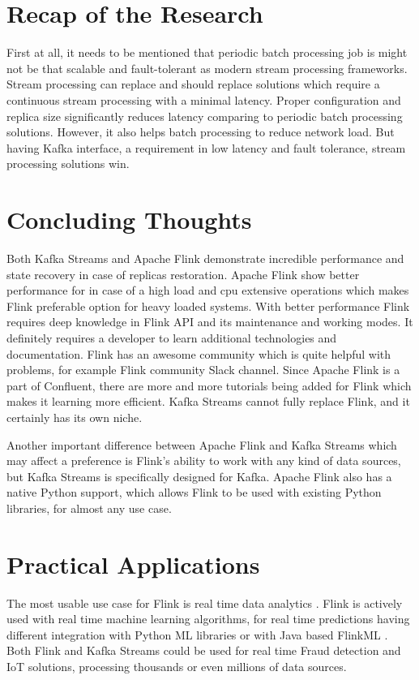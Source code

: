 \section{Recap of the Research}\label{sec:recap-of-the-research}
First at all, it needs to be mentioned that periodic batch processing job
is might not be that scalable and fault-tolerant as modern
stream processing frameworks.
Stream processing can replace and should replace solutions which require
a continuous stream processing with a minimal latency.
Proper configuration and replica size significantly reduces latency comparing
to periodic batch processing solutions.
However, it also helps batch processing to reduce network load.
But having Kafka interface, a requirement in low latency and fault tolerance,
stream processing solutions win.

\section{Concluding Thoughts}\label{sec:concluding-thoughts}
Both Kafka Streams and Apache Flink demonstrate incredible performance
and state recovery in case of replicas restoration.
Apache Flink show better performance for in case of a high load
and cpu extensive operations which makes Flink preferable
option for heavy loaded systems.
With better performance Flink requires deep knowledge in Flink
API and its maintenance and working modes.
It definitely requires a developer to learn additional technologies and documentation.
Flink has an awesome community which is quite helpful with problems,
for example Flink community Slack channel.
Since Apache Flink is a part of Confluent, there are more and more tutorials
being added for Flink which makes it learning more efficient.
Kafka Streams cannot fully replace Flink, and it certainly has its own niche.

Another important difference between Apache Flink and Kafka Streams which
may affect a preference is Flink's ability to work with any kind of data
sources, but Kafka Streams is specifically designed for Kafka.
Apache Flink also has a native Python support, which allows Flink
to be used with existing Python libraries, for almost any use case.

\section{Practical Applications}\label{sec:practical-applications}
The most usable use case for Flink is real time data analytics \cite{flink_use_cases}.
Flink is actively used with real time machine learning algorithms, for
real time predictions having different integration with Python ML libraries
or with Java based FlinkML \cite{flink_ml}.
Both Flink and Kafka Streams could be used for real time Fraud detection
and IoT solutions, processing thousands or even millions of data sources.